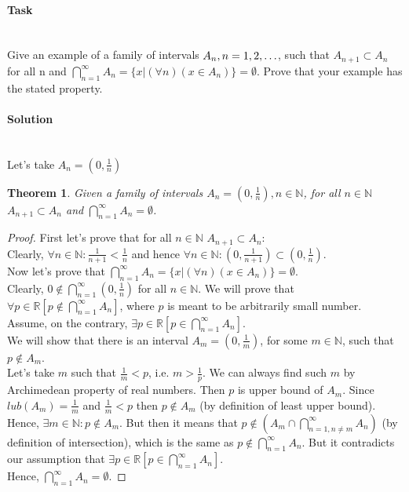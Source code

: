 \documentclass[11pt]{article}
\begin{document}
   \paragraph{Task}\mbox{} \\
       Give an example of a family of intervals $A_{n}, n = 1,2,\mathellipsis$, such that $A_{n+1} \subset A_{n}$ for all n and
       $\displaystyle\bigcap_{n = 1}^{\infty}A_{n} = \{x|(\forall n)(x \in A_{n})\} = \emptyset$.
       Prove that your example has the stated property.
   \paragraph{Solution}\mbox{} \\
       Let's take $A_{n} = (0, \frac{1}{n})$

   \newtheorem*{Theorem}{Theorem}
   \begin{Theorem}
       Given a family of intervals $A_{n} = \left( 0, \frac{1}{n} \right), n \in \mathbb{N}$, for all $n \in \mathbb{N}$ $A_{n+1} \subset A_{n}$  and
       $\displaystyle\bigcap_{n = 1}^{\infty}A_{n} = \emptyset$.
   \end{Theorem}
   \begin{proof}
   First let's prove that for all $n \in \mathbb{N}$ $A_{n+1} \subset A_{n}$:\\
   Clearly, $\forall n \in \mathbb{N}: \frac{1}{n+1} < \frac{1}{n}$ and hence $\forall n \in \mathbb{N}: \left( 0, \frac{1}{n+1} \right) \subset \left(0, \frac{1}{n} \right)$.\\
   Now let's prove that $\displaystyle\bigcap_{n = 1}^{\infty}A_{n} = \{x|(\forall n)(x \in A_{n})\} = \emptyset$.\\
   Clearly, $0 \notin \displaystyle\bigcap_{n = 1}^{\infty} \left( 0, \frac{1}{n} \right)$ for all $n \in \mathbb{N}$.
   We will prove that $\forall p \in \mathbb{R} \left[ p \notin \displaystyle\bigcap_{n = 1}^{\infty}A_{n} \right]$, where $p$  is meant to be arbitrarily small number.\\
   Assume, on the contrary, $\exists p \in \mathbb{R} \left[ p \in \displaystyle\bigcap_{n = 1}^{\infty}A_{n}\right]$.\\
   We will show that there is an interval $A_{m} = \left( 0, \frac{1}{m} \right)$, for some $m \in \mathbb{N}$, such that $p \notin A_{m}$.\\
   Let's take $m$ such that $\frac{1}{m} < p$, i.e. $m > \frac{1}{p}$. We can always find such $m$ by Archimedean property of real numbers.
   Then $p$ is upper bound of $A_{m}$.
   Since $lub(A_{m}) = \frac{1}{m}$ and $\frac{1}{m} < p$ then $p \notin A_{m}$ (by definition of least upper bound). \\
   Hence, $\exists m \in \mathbb{N}: p \notin A_{m}$.
   But then it means that $p \notin \left( A_{m} \cap \displaystyle\bigcap_{n = 1, n \neq m}^{\infty}A_{n} \right)$ (by definition of intersection),
   which is the same as $p \notin \displaystyle\bigcap_{n = 1}^{\infty}A_{n}$.
   But it contradicts our assumption that $\exists p \in \mathbb{R} \left[ p \in \displaystyle\bigcap_{n = 1}^{\infty}A_{n} \right]$.\\
   Hence, $\displaystyle\bigcap_{n = 1}^{\infty}A_{n} = \emptyset$.
   \end{proof}
\end{document}
